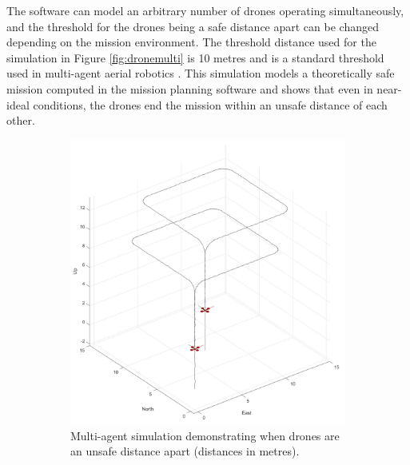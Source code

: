 The software can model an arbitrary number of drones operating simultaneously, and the threshold for the drones being a safe distance apart can be changed depending on the mission environment. The threshold distance used for the simulation in Figure \ref{fig:dronemulti} is 10 metres and is a standard threshold used in multi-agent aerial robotics \cite{crannverdon}. This simulation models a theoretically safe mission computed in the mission planning software and shows that even in near-ideal conditions, the drones end the mission within an unsafe distance of each other. 
 
\begin{figure}[H]
    \centering
    \begin{subfigure}[b]{0.48\textwidth} %
        \centering
        \includegraphics[width=\textwidth]{figs/Samuel/Figures/MultiAgentExampleRed (2).pdf}
        \caption{Multi-agent simulation demonstrating when drones are an unsafe distance apart (distances in metres).}
        \label{fig:1a}
    \end{subfigure}
    \hspace{0.01\textwidth}
    \begin{subfigure}[b]{0.48\textwidth} %
        \centering

\end{subfigure}
\end{figure}
